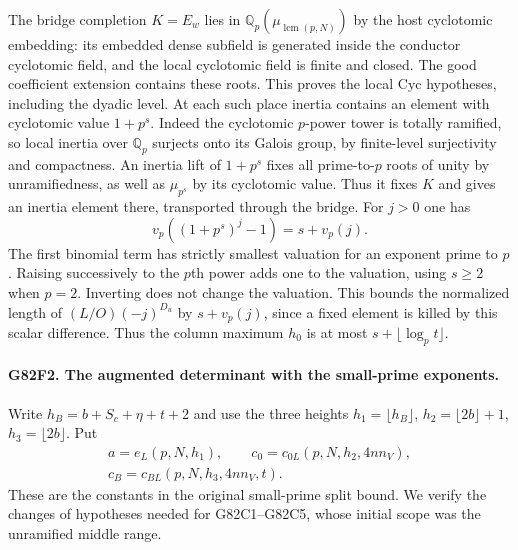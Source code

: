 The bridge completion $K=E_w$ lies in
$\mathbb Q_p(\mu_{\operatorname{lcm}(p,N)})$ by the host
cyclotomic embedding: its embedded dense subfield is generated
inside the conductor cyclotomic field, and the local cyclotomic
field is finite and closed. The good coefficient extension contains
these roots. This proves the local $\mathrm{Cyc}$ hypotheses,
including the dyadic level. At each such place inertia contains
an element with cyclotomic value $1+p^s$. Indeed the cyclotomic
$p$-power tower is totally ramified, so local inertia over
$\mathbb Q_p$ surjects onto its Galois group, by finite-level
surjectivity and compactness. An inertia lift of $1+p^s$ fixes
all prime-to-$p$ roots of unity by unramifiedness, as well as
$\mu_{p^s}$ by its cyclotomic value. Thus it fixes $K$ and gives
an inertia element there, transported through the bridge.
For $j>0$ one has
\[
      v_p((1+p^s)^j-1)=s+v_p(j).
\]
The first binomial term has strictly smallest valuation for an
exponent prime to $p$. Raising successively to the $p$th power
adds one to the valuation, using $s\ge2$ when $p=2$. Inverting
does not change the valuation. This bounds the normalized length
of $(L/O)(-j)^{D_u}$ by $s+v_p(j)$, since a fixed element is
killed by this scalar difference. Thus the column maximum
$h_0$ is at most $s+\lfloor\log_p t\rfloor$.

\paragraph{G82F2. The augmented determinant with the small-prime exponents.}
Write $h_B=b+S_c+\eta+t+2$ and use the three heights
$h_1=\lfloor h_B\rfloor$, $h_2=\lfloor2b\rfloor+1$,
$h_3=\lfloor2b\rfloor$. Put
\[
 \begin{gathered}
 a=e_L(p,N,h_1),\qquad c_0=c_{0L}(p,N,h_2,4n n_V),\\
 c_B=c_{BL}(p,N,h_3,4n n_V,t).
 \end{gathered}
\]
These are the constants in the original small-prime split bound.
We verify the changes of hypotheses needed for G82C1--G82C5,
whose initial scope was the unramified middle range.

